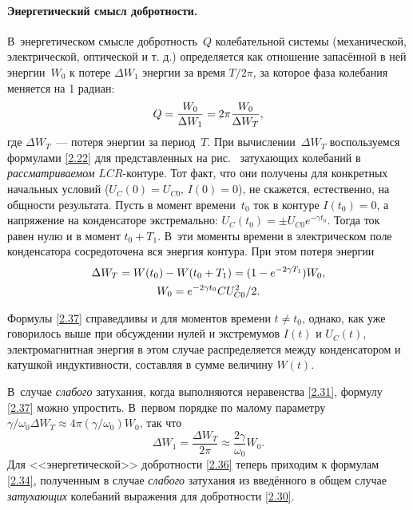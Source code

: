 \paragraph{Энергетический смысл добротности.}
В~энергетическом смысле добротность~$Q$ колебательной системы
(механической, электрической, оптической и т. д.) определяется как отношение
запасённой в ней энергии~$W_0$ к потере $\Delta W_1$ энергии за время $T/2\pi$, за
которое фаза колебания меняется на 1 радиан:
\begin{equation}\eqmark{2.36}
Q=\dfrac{W_0}{\Delta W_1}=2\pi\dfrac{W_0}{\Delta W_T},
\end{equation}
где  $\Delta W_T$~--- потеря энергии за период~$T$.
При вычислении~$\Delta W_T$
воспользуемся формулами \eqref{2.22} для представленных на рис.~
затухающих колебаний в \emph{рассматриваемом} $LCR$-контуре. Тот факт, что
они получены для конкретных начальных условий ($U_C(0)=U_{C0}$, $I(0)=0$),
не скажется, естественно, на общности результата. Пусть в момент времени~$t_0$ ток
в контуре $I(t_0)=0$, а напряжение на конденсаторе экстремально: $U_C(t_0)=\pm
U_{C0}e^{-\gamma t_0}$. Тогда ток равен нулю и в момент $t_0+T_1$. В~эти моменты
времени в электрическом поле конденсатора сосредоточена вся энергия контура. При
этом потеря энергии
\begin{equation}
	\eqmark{2.37}
		\begin{gathered}[c]
			 \Delta W_T = W(t_0)-W(t_0+T_1)=(1-e^{-2\gamma T_1})W_0, \\
			 W_0 = e^{-2\gamma t_0}CU_{C0}^2/2.
		\end{gathered}
\end{equation}

Формулы \eqref{2.37} справедливы и для моментов времени $t\ne t_0$, однако, как
уже говорилось выше при обсуждении нулей и экстремумов $I(t)$ и $U_C(t)$,
электромагнитная энергия в этом случае распределяется между конденсатором и
катушкой индуктивности, составляя в сумме величину $W(t)$.

В~случае \emph{слабого} затухания, когда выполняются неравенства
\eqref{2.31}, формулу \eqref{2.37} можно упростить. В~первом порядке по малому
параметру $\gamma/\omega_0 \Delta W_T\approx 4\pi(\gamma/\omega_0)W_0$, так что
\begin{equation*}
\Delta W_1=\frac{\Delta W_T}{2\pi}\approx \frac{2\gamma}{\omega_0}W_0.
\end{equation*}
Для <<энергетической>>
добротности \eqref{2.36} теперь приходим к формулам \eqref{2.34}, полученным в
случае \emph{слабого} затухания из введённого в общем случае
\emph{затухающих} колебаний выражения для добротности \eqref{2.30}.

